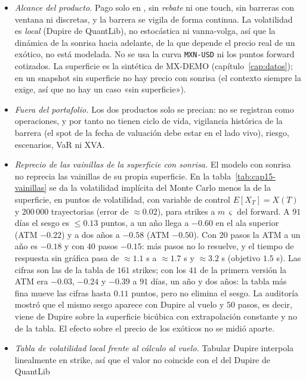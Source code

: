 \begin{limites}
  \begin{itemize}
    \item \emph{Alcance del producto.} Pago solo en \MXN{}, sin \emph{rebate} ni one touch, sin barreras con ventana ni discretas, y la barrera se vigila de
          forma continua. La volatilidad es \emph{local} (Dupire de QuantLib), no estocástica ni vanna-volga, así que la dinámica de la sonrisa
          hacia adelante, de la que depende el precio real de un exótico, no está modelada. No se usa la curva \texttt{MXN-USD} ni los puntos forward cotizados.
          La superficie es la sintética de MX-DEMO (capítulo~\ref{cap:datos}); en un snapshot sin superficie no hay precio con sonrisa
          (el contexto siempre la exige, así que no hay un caso «sin superficie»).
    \item \emph{Fuera del portafolio.} Los dos productos solo se precian: no se registran como operaciones, y por tanto no tienen ciclo de vida, vigilancia
          histórica de la barrera (el spot de la fecha de valuación debe estar en el lado vivo), riesgo, escenarios, VaR ni XVA.
    \item \emph{Reprecio de las vainillas de la superficie con sonrisa.} El modelo con sonrisa no reprecia las vainillas de su propia superficie. En la
          tabla~\ref{tab:cap15-vainillas} se da la volatilidad implícita del Monte Carlo menos la de la superficie, en puntos de volatilidad, con
          variable de control $E[X_T]=X(T)$ y $200\,000$ trayectorias (error de $\approx0.02$), para strikes a $m\,\varsigma$ del forward. A $91$ días el
          sesgo es $\le0.13$ puntos, a un año llega a $-0.60$ en el ala superior (ATM $-0.22$) y a dos años a $-0.58$ (ATM $-0.50$). Con $20$ pasos la ATM a un año es $-0.18$ y con
          $40$ pasos $-0.15$: más pasos no lo resuelve, y el tiempo de respuesta sin gráfica pasa de $\approx1.1$ s a $\approx1.7$ s y $\approx3.2$ s (objetivo $1.5$ s). Las cifras son las de la tabla de $161$ strikes; con
          los $41$ de la primera versión la ATM era $-0.03$, $-0.24$ y $-0.39$ a $91$ días, un año y dos años: la tabla más fina mueve las cifras hasta $0.11$ puntos, pero no elimina el sesgo. La auditoría
          mostró que el mismo sesgo aparece con Dupire al vuelo y $50$ pasos, es decir, viene de Dupire sobre la superficie bicúbica con extrapolación constante y
          no de la tabla. El efecto sobre el precio de los exóticos no se midió aparte.
    \item \emph{Tabla de volatilidad local frente al cálculo al vuelo.} Tabular Dupire interpola linealmente en strike, así que el valor no coincide con el del Dupire de QuantLib

\end{itemize}
\end{limites}
